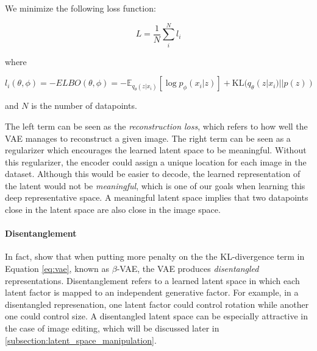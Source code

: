 
We minimize the following loss function:

\begin{equation}
      L = \frac{1}{N}\sum_{i}^{N}l_i
\end{equation}

where 

\begin{equation}\label{eq:vae}
      l_i(\theta, \phi) = -ELBO(\theta, \phi) = - \mathbb{E}_{q_\theta(z|x_i)}[\log p_\phi(x_i | z)] + \mathrm{KL}(q_\theta(z|x_i)||p(z))
\end{equation}

and $N$ is the number of datapoints. 

The left term can be seen as the \emph{reconstruction loss}, which refers to how well 
the \ac{VAE} manages to reconstruct a given image. The right term can be seen as a 
regularizer which encourages the learned latent space to be meaningful. Without this 
regularizer, the encoder could assign a unique location for each image in the dataset. 
Although this would be easier to decode, the learned representation of the latent 
would not be \emph{meaningful}, which is one of our goals when learning this 
deep representative space.
 A meaningful latent space implies that two datapoints close 
in the latent space are also close in the image space. 


\paragraph{Disentanglement}\label{sec:disentanglement}

In fact, \cite{higgins2017betavae} show that when putting more penalty on the 
the \ac{KL}-divergence term in Equation \ref{eq:vae}, known as $\beta$-VAE, the \ac{VAE}
produces \emph{disentangled} representations. Disentanglement refers to a learned 
latent space in which each latent factor is mapped to an 
independent generative factor. For example, in a disentangled represenation, 
 one latent factor could control rotation 
while another one could control size. A disentangled latent space can be especially attractive 
in the case of image editing, which will be discussed later in \ref{subsection:latent_space_manipulation}.

